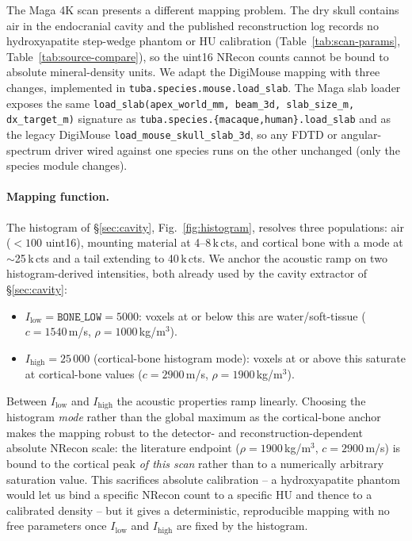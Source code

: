 \documentclass{compactarticle}
\begin{document}
The Maga 4K scan presents a different mapping problem. The dry skull
contains air in the endocranial cavity and the published reconstruction
log records no hydroxyapatite step-wedge phantom or HU calibration
(Table~\ref{tab:scan-params}, Table~\ref{tab:source-compare}), so the
uint16 NRecon counts cannot be bound to absolute mineral-density units.
We adapt the DigiMouse mapping with three changes, implemented in
\texttt{tuba.species.mouse.\allowbreak load\_slab}. The Maga slab
loader exposes the same
\texttt{load\_slab(apex\_world\_mm, beam\_3d, slab\_size\_m, dx\_target\_m)}
signature as \texttt{tuba.species.\{macaque,human\}.load\_slab} and as
the legacy DigiMouse \texttt{load\_mouse\_skull\_slab\_3d}, so any
FDTD or angular-spectrum driver wired against one species runs on the
other unchanged (only the species module changes).

\paragraph{Mapping function.} The histogram of \S\ref{sec:cavity},
Fig.~\ref{fig:histogram}, resolves three populations: air ($<100$
uint16), mounting material at 4--8\,k\,cts, and cortical bone with a
mode at $\sim$25\,k\,cts and a tail extending to 40\,k\,cts. We anchor the acoustic
ramp on two histogram-derived intensities, both already used by the
cavity extractor of \S\ref{sec:cavity}:
\begin{itemize}[leftmargin=*]
\item $I_{\mathrm{low}} = \texttt{BONE\_LOW} = 5000$: voxels at or below
      this are water/soft-tissue ($c=1540$\,m/s, $\rho=1000$\,kg/m$^3$).
\item $I_{\mathrm{high}} = 25\,000$ (cortical-bone histogram mode):
      voxels at or above this saturate at cortical-bone values
      ($c=2900$\,m/s, $\rho=1900$\,kg/m$^3$).
\end{itemize}
Between $I_{\mathrm{low}}$ and $I_{\mathrm{high}}$ the acoustic
properties ramp linearly. Choosing the histogram \emph{mode} rather than
the global maximum as the cortical-bone anchor makes the mapping robust
to the detector- and reconstruction-dependent absolute NRecon scale: the
literature endpoint ($\rho=1900$\,kg/m$^3$, $c=2900$\,m/s) is bound to
the cortical peak \emph{of this scan} rather than to a numerically
arbitrary saturation value. This sacrifices absolute calibration -- a
hydroxyapatite phantom would let us bind a specific NRecon count to a
specific HU and thence to a calibrated density -- but it gives a
deterministic, reproducible mapping with no free parameters once
$I_{\mathrm{low}}$ and $I_{\mathrm{high}}$ are fixed by the histogram.
\end{document}
